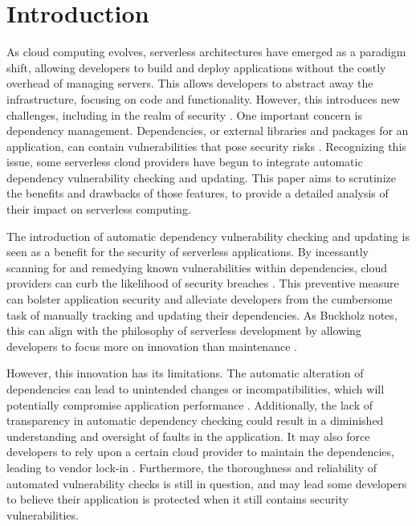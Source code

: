 \documentclass[sigconf]{acmart}
\begin{document}

\maketitle


\section{Introduction}
As cloud computing evolves, serverless architectures have emerged as a paradigm shift, allowing developers to build and deploy applications without the costly overhead of managing servers. This allows developers to abstract away the infrastructure, focusing on code and functionality. However, this introduces new challenges, including in the realm of security \cite{baldini2017serverless}. One important concern is dependency management. Dependencies, or external libraries and packages for an application, can contain vulnerabilities that pose security risks \cite{marin2022serverless}. Recognizing this issue, some serverless cloud providers have begun to integrate automatic dependency vulnerability checking and updating. This paper aims to scrutinize the benefits and drawbacks of those features, to provide a detailed analysis of their impact on serverless computing.

The introduction of automatic dependency vulnerability checking and updating is seen as a benefit for the security of serverless applications. By incessantly scanning for and remedying known vulnerabilities within dependencies, cloud providers can curb the likelihood of security breaches \cite{snyk2023security}. This preventive measure can bolster application security and alleviate developers from the cumbersome task of manually tracking and updating their dependencies. As Buckholz notes, this can align with the philosophy of serverless development by allowing developers to focus more on innovation than maintenance \cite{buckholz2018serverless}.

However, this innovation has its limitations. The automatic alteration of dependencies can lead to unintended changes or incompatibilities, which will potentially compromise application performance \cite{benischke2023updates}. Additionally, the lack of transparency in automatic dependency checking could result in a diminished understanding and oversight of faults in the application. It may also force developers to rely upon a certain cloud provider to maintain the dependencies, leading to vendor lock-in \cite{kavis2014cloud}.
Furthermore, the thoroughness and reliability of automated vulnerability checks is still in question, and may lead some developers to believe their application is protected when it still contains security vulnerabilities.
\end{document}
